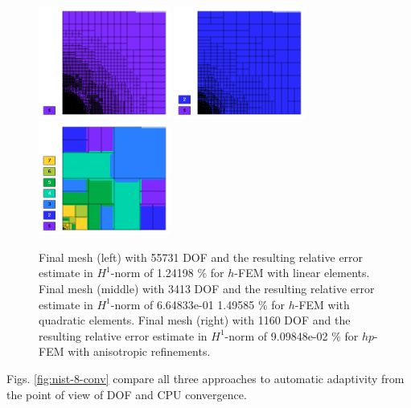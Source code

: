 \documentclass[12pt]{elsarticle}
\begin{document}
\begin{figure}[!ht]
\centering
\vspace{-5mm}
\includegraphics[height=3.7cm]{nist/nist-8/mesh_h1_aniso.png}
\includegraphics[height=3.7cm]{nist/nist-8/mesh_h2_aniso.png}
\includegraphics[height=3.7cm]{nist/nist-8/mesh_hp_aniso.png}
\vspace{-4mm}
\caption{
Final mesh (left) with 55731 DOF and the resulting
relative error estimate in $H^1$-norm of 1.24198 \% for $h$-FEM with linear elements.
Final mesh (middle) with 3413 DOF and the resulting
relative error estimate in $H^1$-norm of 6.64833e-01 1.49585 \% for $h$-FEM with quadratic elements.
Final mesh (right) with 1160 DOF and the resulting
relative error estimate in $H^1$-norm of 9.09848e-02 \% for $hp$-FEM with anisotropic refinements.}
\label{fig:nist-8-hp-aniso}
\end{figure}

Figs. \ref{fig:nist-8-conv} compare all
three approaches to automatic adaptivity from the point
of view of DOF and CPU convergence.
\end{document}
